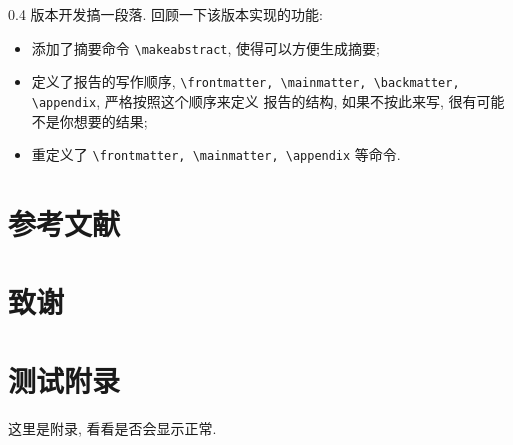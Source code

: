 \documentclass{cugrep}
\begin{document}
0.4 版本开发搞一段落. 回顾一下该版本实现的功能:

\begin{itemize}
    \item 添加了摘要命令 \verb|\makeabstract|, 使得可以方便生成摘要;
    \item 定义了报告的写作顺序, \verb|\frontmatter, \mainmatter, \backmatter, \appendix|, 严格按照这个顺序来定义
        报告的结构, 如果不按此来写, 很有可能不是你想要的结果;
    \item 重定义了 \verb|\frontmatter, \mainmatter, \appendix| 等命令.
\end{itemize}
\backmatter
\chapter{参考文献}
\chapter{致谢}
\appendix
\chapter{测试附录}
这里是附录, 看看是否会显示正常.

\backmatter 
\end{document}
